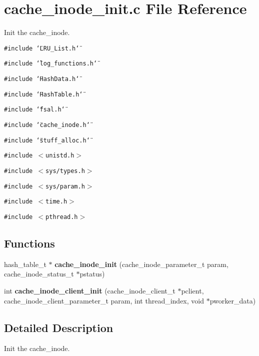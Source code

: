 \section{cache\_\-inode\_\-init.c File Reference}
\label{cache__inode__init_8c}
Init the cache\_\-inode. 

{\tt \#include \char`\"{}LRU\_\-List.h\char`\"{}}\par
{\tt \#include \char`\"{}log\_\-functions.h\char`\"{}}\par
{\tt \#include \char`\"{}Hash\-Data.h\char`\"{}}\par
{\tt \#include \char`\"{}Hash\-Table.h\char`\"{}}\par
{\tt \#include \char`\"{}fsal.h\char`\"{}}\par
{\tt \#include \char`\"{}cache\_\-inode.h\char`\"{}}\par
{\tt \#include \char`\"{}stuff\_\-alloc.h\char`\"{}}\par
{\tt \#include $<$unistd.h$>$}\par
{\tt \#include $<$sys/types.h$>$}\par
{\tt \#include $<$sys/param.h$>$}\par
{\tt \#include $<$time.h$>$}\par
{\tt \#include $<$pthread.h$>$}\par
\subsection*{Functions}
\begin{CompactItemize}
\item 
hash\_\-table\_\-t $\ast$ {\bf cache\_\-inode\_\-init} (cache\_\-inode\_\-parameter\_\-t param, cache\_\-inode\_\-status\_\-t $\ast$pstatus)
\item 
int {\bf cache\_\-inode\_\-client\_\-init} (cache\_\-inode\_\-client\_\-t $\ast$pclient, cache\_\-inode\_\-client\_\-parameter\_\-t param, int thread\_\-index, void $\ast$pworker\_\-data)
\end{CompactItemize}


\subsection{Detailed Description}
Init the cache\_\-inode. 

